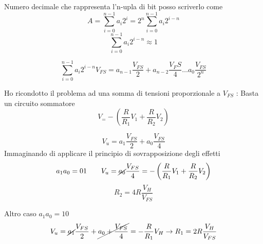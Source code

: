 \documentclass{article}
\begin{document}
Numero decimale che rappresenta l'n-upla di bit posso scriverlo come
\[A = \sum\limits_{i=0}^{n-1} a_i2^i  = 2^n\sum\limits_{i=0}^{n-1} a_i2^{i-n} \]
\[ \sum\limits_{i=0}^{n-1} a_i2^{i-n} \approx 1 \]

\[\sum\limits_{i=0}^{n-1} a_i2^{i-n} V_{FS} = a_{n-1}\frac{V_{FS}}{2} + a_{n-2}\frac{V_FS}{4} \ldots a_0\frac{V_{FS}}{2^n}\]

Ho ricondotto il problema ad una somma di tensioni proporzionale a $V_{FS}$ : Basta un circuito sommatore
\[ V_ = - \left( \frac{R}{R_1} V_1 + \frac{R}{R_2}V_2\right) \]

\[ V_u = a_1 \frac{V_{FS}}{2} + a_0\frac{V_{FS}}{4} \]
Immaginando di applicare il principio di sovrapposizione degli effetti
\[  a_1a_0 = 01\qquad V_u = \cancel{a_0}\frac{V_{FS}}{4} = -\left(\frac{R}{R_1}V_1 + \frac{R}{R_2} V_2\right) \]
\[ R_2 = 4R\frac{V_H}{V_{FS}} \]

Altro caso $a_1a_0 = 10$
\[ V_u = \cancel{a_1} \frac{V_{FS}}{2} + \cancel{a_0 + \frac{V_{FS}}{4}}  = -\frac{R}{R_1} V_H \to
    R_1 = 2R \frac{V_H}{V_{FS}}
\]
\end{document}

